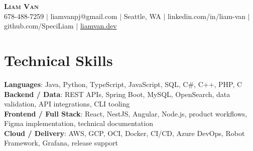 \documentclass[letterpaper,11pt]{article}
\begin{document}

%
\begin{center}
    \textbf{\Huge \scshape Liam Van} \\ \vspace{1pt}
    \small 678-488-7259 $|$ \small {liamvanpj@gmail.com} $|$ Seattle, WA
 {{$|$ linkedin.com/in/liam-van} {$|$ github.com/SpeciLiam} {$|$ \href{https://liamvan.dev}{liamvan.dev}}}

\end{center}

\section{Technical Skills}
 \begin{itemize}[leftmargin=0.15in, label={}]
    \small{\item{
     \textbf{Languages}{: Java, Python, TypeScript, JavaScript, SQL, C\#, C++, PHP, C} \\
     \textbf{Backend / Data}{: REST APIs, Spring Boot, MySQL, OpenSearch, data validation, API integrations, CLI tooling} \\
     \textbf{Frontend / Full Stack}{: React, NestJS, Angular, Node.js, product workflows, Figma implementation, technical documentation} \\
     \textbf{Cloud / Delivery}{: AWS, GCP, OCI, Docker, CI/CD, Azure DevOps, Robot Framework, Grafana, release support} \\
    }}
 \end{itemize}
%

\end{document}
